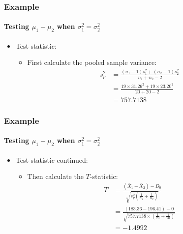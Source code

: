 \documentclass[12pt]{beamer}
\begin{document}
	\begin{frame}
		\frametitle{Example}
		\framesubtitle{Testing $\mu_1 - \mu_2$ when $\sigma_1^2 = \sigma_2^2$}
		
		\begin{itemize}[label={\color{blue}$\blacktriangleright$}]
			\item Test statistic:
			\begin{itemize}[label={\color{blue}$\blacktriangleright$}]
				\item First calculate the pooled sample variance:
				\[
				\begin{aligned}
					s_p^2 &= \frac{(n_1 - 1)s_1^2 + (n_2 - 1)s_2^2}{n_1 + n_2 - 2} \\[1ex]
					&= \frac{19 \times 31.26^2 + 19 \times 23.20^2}{20 + 20 - 2} \\[1ex]
					&= 757.7138
				\end{aligned}
				\]
			\end{itemize}
		\end{itemize}
		
	\end{frame}
	\begin{frame}
		\frametitle{Example}
		\framesubtitle{Testing $\mu_1 - \mu_2$ when $\sigma_1^2 = \sigma_2^2$}
		
		\begin{itemize}[label={\color{blue}$\blacktriangleright$}]
			\item Test statistic continued:
			\begin{itemize}[label={\color{blue}$\blacktriangleright$}]
				\item Then calculate the $T$-statistic:
				\[
				\begin{aligned}
					T &= \frac{(\overline{X}_1 - \overline{X}_2) - D_0}{\sqrt{s_p^2 \left(\frac{1}{n_1} + \frac{1}{n_2}\right)}} \\[2ex]
					&= \frac{(183.36 - 196.41) - 0}{\sqrt{757.7138 \times \left(\frac{1}{20} + \frac{1}{20}\right)}} \\[2ex]
					&= -1.4992
				\end{aligned}
				\]
			\end{itemize}
		\end{itemize}
		
	\end{frame}
\end{document}
